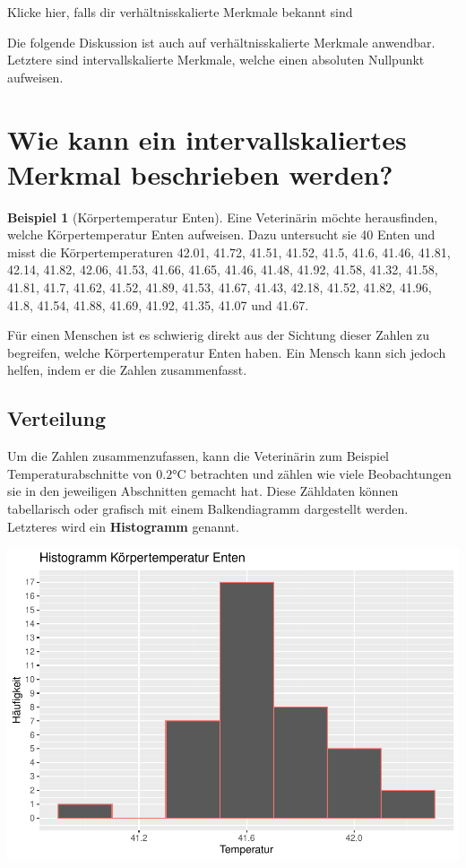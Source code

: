 \documentclass[
]{book}
\theoremstyle{definition}
\theoremstyle{definition}
\newtheorem{example}{Beispiel}[chapter]
\theoremstyle{definition}
\theoremstyle{definition}
\theoremstyle{remark}
\begin{document}
Klicke hier, falls dir verhältnisskalierte Merkmale bekannt sind

Die folgende Diskussion ist auch auf verhältnisskalierte Merkmale anwendbar. Letztere sind intervallskalierte Merkmale, welche einen absoluten Nullpunkt aufweisen.

\section{Wie kann ein intervallskaliertes Merkmal beschrieben werden?}\label{intervallskalierte-merkmale-beschreibung}

\begin{example}[Körpertemperatur Enten]
\protect\hypertarget{exm:ducktemp}{}\label{exm:ducktemp}Eine Veterinärin möchte herausfinden, welche Körpertemperatur Enten aufweisen. Dazu untersucht sie 40 Enten und misst die Körpertemperaturen 42.01, 41.72, 41.51, 41.52, 41.5, 41.6, 41.46, 41.81, 42.14, 41.82, 42.06, 41.53, 41.66, 41.65, 41.46, 41.48, 41.92, 41.58, 41.32, 41.58, 41.81, 41.7, 41.62, 41.52, 41.89, 41.53, 41.67, 41.43, 42.18, 41.52, 41.82, 41.96, 41.8, 41.54, 41.88, 41.69, 41.92, 41.35, 41.07 und 41.67.
\end{example}

Für einen Menschen ist es schwierig direkt aus der Sichtung dieser Zahlen zu begreifen, welche Körpertemperatur Enten haben. Ein Mensch kann sich jedoch helfen, indem er die Zahlen zusammenfasst.

\subsection{Verteilung}\label{verteilung}

Um die Zahlen zusammenzufassen, kann die Veterinärin zum Beispiel Temperaturabschnitte von \(0.2\)°C betrachten und zählen wie viele Beobachtungen sie in den jeweiligen Abschnitten gemacht hat. Diese Zähldaten können tabellarisch oder grafisch mit einem Balkendiagramm dargestellt werden. Letzteres wird ein \textbf{Histogramm} genannt.

\includegraphics{aps_statistik1_files/figure-latex/enten_histogramm-1.pdf}
\end{document}
